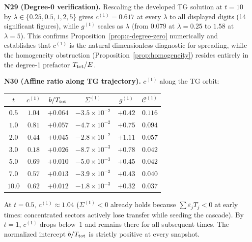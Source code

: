 \documentclass[11pt]{article}
\theoremstyle{definition}
\newcommand{\cC}{\mathcal{C}}
\begin{document}
\medskip\noindent\textbf{N29 (Degree-0 verification).}
Rescaling the developed TG solution at $t=10$ by
$\lambda\in\{0.25,0.5,1,2,5\}$ gives $c^{(1)}=0.617$
at every $\lambda$ to all displayed digits
(14 significant figures), while $g^{(1)}$ scales as
$\lambda$ (from $0.079$ at $\lambda=0.25$ to $1.58$
at $\lambda=5$).
This confirms Proposition~\ref{prop:c-degree-zero}
numerically and establishes that $c^{(1)}$ is the
natural dimensionless diagnostic for spreading,
while the homogeneity obstruction
(Proposition~\ref{prop:homogeneity}) resides
entirely in the degree-1 prefactor $T_{\rm tot}/E$.

\medskip\noindent\textbf{N30 (Affine ratio along TG
trajectory).}
$c^{(1)}$ along the TG orbit:
\begin{center}
\renewcommand{\arraystretch}{1.2}
\begin{tabular}{@{}cccccc@{}}
\toprule
$t$ & $c^{(1)}$ & $b/T_{\rm tot}$
  & $\Sigma^{(1)}$ & $g^{(1)}$ & $\cC^{(1)}$ \\
\midrule
$0.5$ & $1.04$ & $+0.064$ & $-3.5\!\times\!10^{-2}$ & $+0.42$ & $0.116$ \\
$1.0$ & $0.81$ & $+0.057$ & $-4.7\!\times\!10^{-2}$ & $+0.75$ & $0.094$ \\
$2.0$ & $0.44$ & $+0.045$ & $-2.8\!\times\!10^{-2}$ & $+1.11$ & $0.057$ \\
$3.0$ & $0.18$ & $+0.026$ & $-8.7\!\times\!10^{-3}$ & $+0.78$ & $0.042$ \\
$5.0$ & $0.69$ & $+0.010$ & $-5.0\!\times\!10^{-3}$ & $+0.45$ & $0.042$ \\
$7.0$ & $0.57$ & $+0.013$ & $-3.9\!\times\!10^{-3}$ & $+0.43$ & $0.040$ \\
$10.0$ & $0.62$ & $+0.012$ & $-1.8\!\times\!10^{-3}$ & $+0.32$ & $0.037$ \\
\bottomrule
\end{tabular}
\end{center}
At $t=0.5$, $c^{(1)}\approx 1.04$ ($\Sigma^{(1)}<0$ already
holds because $\sum\varepsilon_j T_j<0$ at early times:
concentrated sectors actively lose transfer while
seeding the cascade).  By $t=1$, $c^{(1)}$ drops below~$1$
and remains there for all subsequent times.  The
normalized intercept $b/T_{\rm tot}$ is strictly positive
at every snapshot.
\end{document}
